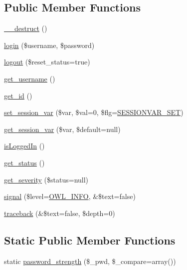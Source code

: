 \subsection*{Public Member Functions}
\begin{DoxyCompactItemize}
\item 
\hyperlink{classUser_accd20149a7414612c1505e022eb63ffc}{\_\-\_\-destruct} ()
\item 
\hyperlink{classUser_a2c4fae5935ebf84e787126795bf42988}{login} (\$username, \$password)
\item 
\hyperlink{classUser_a95e19a7d141f922c2870a6404ff641b1}{logout} (\$reset\_\-status=true)
\item 
\hyperlink{classUser_a1348ddf190d4df2518665fb51305a902}{get\_\-username} ()
\item 
\hyperlink{classUser_a21bee530c9f8304e9e74e274f0f655af}{get\_\-id} ()
\item 
\hyperlink{classUser_a80108765c46ddec1ab776a774ae07f53}{set\_\-session\_\-var} (\$var, \$val=0, \$flg=\hyperlink{class_8sessionhandler_8php_af9e860b1663497a46177b0ec35d6a9f5}{SESSIONVAR\_\-SET})
\item 
\hyperlink{classUser_a84f3693077e777cc1d61b45fcecdb36c}{get\_\-session\_\-var} (\$var, \$default=null)
\item 
\hyperlink{classUserHandler_a4539c12ed2ce12a9147d61496854d5ab}{isLoggedIn} ()
\item 
\hyperlink{class__OWL_a99ec771fa2c5c279f80152cc09e489a8}{get\_\-status} ()
\item 
\hyperlink{class__OWL_adf9509ef96858be7bdd9414c5ef129aa}{get\_\-severity} (\$status=null)
\item 
\hyperlink{class__OWL_a51ba4a16409acf2a2f61f286939091a5}{signal} (\$level=\hyperlink{owl_8severitycodes_8php_a139328861128689f2f4def6a399d9057}{OWL\_\-INFO}, \&\$text=false)
\item 
\hyperlink{class__OWL_aa29547995d6741b7d2b90c1d4ea99a13}{traceback} (\&\$text=false, \$depth=0)
\end{DoxyCompactItemize}
\subsection*{Static Public Member Functions}
\begin{DoxyCompactItemize}
\item 
static \hyperlink{classUser_a4d4ea8d545686fa335e8597f1bab73d2}{password\_\-strength} (\$\_\-pwd, \$\_\-compare=array())
\end{DoxyCompactItemize}
